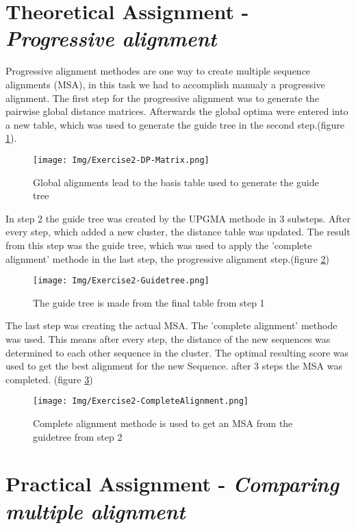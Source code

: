 \documentclass[%
   10pt,              %
   nenglish,           %
   a4paper,           %
   DIV11,             %
]{scrartcl}%
\begin{document}
\section*{Theoretical Assignment - \textsl{Progressive alignment}}
Progressive alignment methodes are one way to create multiple sequence alignments (MSA), in this task we had to accomplish manualy a progressive alignment. The first step for the progressive alignment was to generate the pairwise global distance matrices. Afterwards the global optima were entered into a new table, which was used to generate the guide tree in the second step.(figure \ref{DP2}).
\begin{figure}[h]
	\texttt{[image: Img/Exercise2-DP-Matrix.png]}
	\caption{ Global alignments lead to the basis table used to generate the guide tree}
	\label{DP2}
\end{figure}

In step 2 the guide tree was created by the UPGMA methode in 3 substeps. After every step, which added a new cluster, the distance table was updated. The result from this step was the guide tree, which was used to apply the 'complete alignment' methode in the last step, the progressive alignment step.(figure \ref{guidetree2})


\begin{figure}[h]
	\texttt{[image: Img/Exercise2-Guidetree.png]}
	\caption{ The guide tree is made from the final table from step 1}
	\label{guidetree2}
\end{figure}

The last step was creating the actual MSA. The 'complete alignment' methode was used. This means after every step, the distance of the new sequences was determined to each other sequence in the cluster. The optimal resulting score was used to get the best alignment for the new Sequence. after 3 steps the MSA was completed. (figure \ref{completealign})
\begin{figure}[h]
	\texttt{[image: Img/Exercise2-CompleteAlignment.png]}
	\caption{ Complete alignment methode is used to get an MSA from the guidetree from step 2	}
	\label{completealign}
\end{figure}
\section*{Practical Assignment - \textsl{Comparing multiple alignment}}
 
\end{document}
